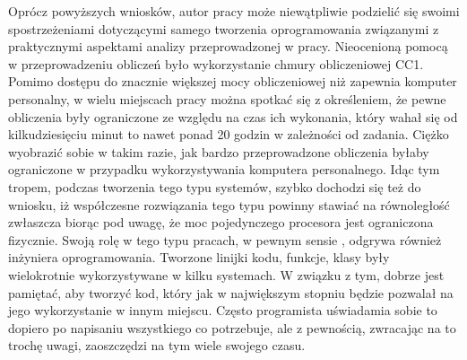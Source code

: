Oprócz powyższych wniosków, autor pracy może niewątpliwie podzielić się swoimi spostrzeżeniami dotyczącymi samego tworzenia oprogramowania związanymi z praktycznymi aspektami analizy przeprowadzonej w pracy. Nieocenioną pomocą w przeprowadzeniu obliczeń było wykorzystanie chmury obliczeniowej CC1. Pomimo dostępu do znacznie większej mocy obliczeniowej niż zapewnia komputer personalny, w wielu miejscach pracy można spotkać się z określeniem, że pewne obliczenia były ograniczone ze względu na czas ich wykonania, który wahał się od kilkudziesięciu minut to nawet ponad 20 godzin w zależności od zadania. Ciężko wyobrazić sobie w takim razie, jak bardzo przeprowadzone obliczenia byłaby ograniczone w przypadku wykorzystywania komputera personalnego. Idąc tym tropem, podczas tworzenia tego typu systemów, szybko dochodzi się też do wniosku, iż współczesne rozwiązania tego typu powinny stawiać na równoległość zwłaszcza biorąc pod uwagę, że moc pojedynczego procesora jest ograniczona fizycznie. Swoją rolę w tego typu pracach, w pewnym sensie , odgrywa również inżyniera oprogramowania. Tworzone linijki kodu, funkcje, klasy były wielokrotnie wykorzystywane w kilku systemach. W związku z tym, dobrze jest pamiętać, aby tworzyć kod, który jak w największym stopniu będzie pozwalał na jego wykorzystanie w innym miejscu. Często programista uświadamia sobie to dopiero po napisaniu wszystkiego co potrzebuje, ale z pewnością, zwracając na to trochę uwagi, zaoszczędzi na tym wiele swojego czasu.
